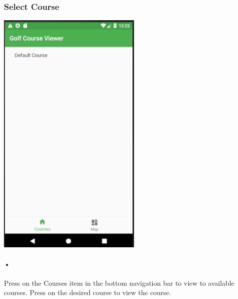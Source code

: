 \documentclass{article}
\begin{document}
	\subsubsection{Select Course}
	\includegraphics[scale=0.8]{CourseListUI.PNG}
	\paragraph{•}
	Press on the Courses item in the bottom navigation bar to view to available courses. Press on the desired course to view the course. 
	
	
\end{document}
